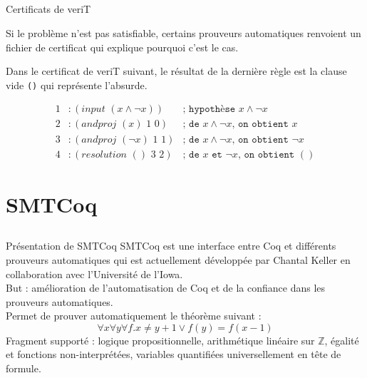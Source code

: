 \documentclass{beamer}
\begin{document}
\subsection{}
\begin{frame}{Certificats de veriT}

Si le problème n'est pas satisfiable, certains prouveurs automatiques renvoient un fichier de certificat qui explique pourquoi c'est le cas.

\hspace{1cm}

Dans le certificat de veriT suivant, le résultat de la dernière règle est la clause vide \texttt{()} qui représente l'absurde.

\begin{align*}
    1&:(input\,\,(x \wedge \neg x)) &\texttt{; hypothèse } x \wedge \neg x\\
    2&:(andproj \,\,(x) \,\,1\,\, 0) &\texttt{; de } x \wedge \neg x \texttt{, on obtient } x \\
    3&:(andproj \,\,(\neg x)\,\, 1\,\, 1) &\texttt{; de } x \wedge \neg x \texttt{, on obtient } \neg x\\
    4&:(resolution \,\,() \,\,3\,\, 2) &\texttt{; de } x \texttt{ et } \neg x \texttt{, on obtient } ()
\end{align*}

    
    
\end{frame}



\section{SMTCoq}

\subsection{}
\begin{frame}{Présentation de SMTCoq}
SMTCoq est une interface entre Coq et différents prouveurs automatiques qui est actuellement développée par Chantal Keller en collaboration avec l'Université de l'Iowa. \\
\vspace*{7mm}
But : amélioration de l'automatisation de Coq et de la confiance dans les prouveurs automatiques. \\
\vspace*{7mm}
Permet de prouver automatiquement le théorème suivant :
\[ \forall x \forall y \forall f. x \neq y + 1 \vee f(y) = f(x-1) \]
Fragment supporté : logique propositionnelle, arithmétique linéaire sur $\mathbb{Z}$, égalité et fonctions non-interprétées, variables quantifiées universellement en tête de formule.

\end{frame}
\end{document}
